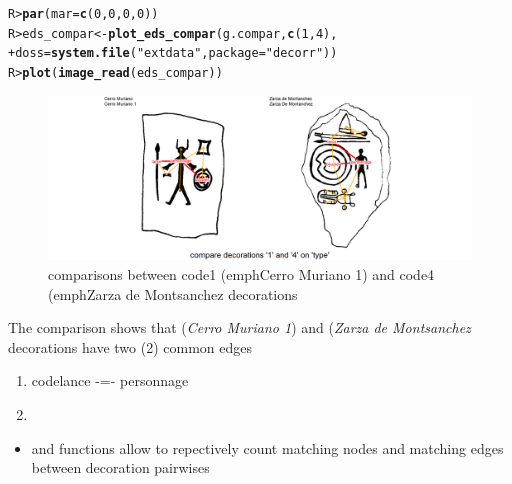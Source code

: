 \documentclass[article]{jss}\usepackage[]{graphicx}\usepackage[]{color}
\makeatletter
\def\maxwidth{ %
  \ifdim\Gin@nat@width>\linewidth
    \linewidth
  \else
    \Gin@nat@width
  \fi
}
\newcommand{\hlnum}[1]{\textcolor[rgb]{0.686,0.059,0.569}{#1}}%
\newcommand{\hlstr}[1]{\textcolor[rgb]{0.192,0.494,0.8}{#1}}%
\newcommand{\hlstd}[1]{\textcolor[rgb]{0.345,0.345,0.345}{#1}}%
\newcommand{\hlkwb}[1]{\textcolor[rgb]{0.69,0.353,0.396}{#1}}%
\newcommand{\hlkwc}[1]{\textcolor[rgb]{0.333,0.667,0.333}{#1}}%
\newcommand{\hlkwd}[1]{\textcolor[rgb]{0.737,0.353,0.396}{\textbf{#1}}}%
\newenvironment{kframe}{%
 \def\at@end@of@kframe{}%
 \ifinner\ifhmode%
  \def\at@end@of@kframe{\end{minipage}}%
  \begin{minipage}{\columnwidth}%
 \fi\fi%
 \def\FrameCommand##1{\hskip\@totalleftmargin \hskip-\fboxsep
 \colorbox{shadecolor}{##1}\hskip-\fboxsep
     \hskip-\linewidth \hskip-\@totalleftmargin \hskip\columnwidth}%
 \MakeFramed {\advance\hsize-\width
   \@totalleftmargin\z@ \linewidth\hsize
   \@setminipage}}%
 {\par\unskip\endMakeFramed%
 \at@end@of@kframe}
\newenvironment{knitrout}{}{} %
\makeatother
\begin{document}
\begin{knitrout}
\color{fgcolor}\begin{kframe}
\begin{alltt}
\hlstd{R> }\hlkwd{par}\hlstd{(}\hlkwc{mar}\hlstd{=}\hlkwd{c}\hlstd{(}\hlnum{0}\hlstd{,}\hlnum{0}\hlstd{,}\hlnum{0}\hlstd{,}\hlnum{0}\hlstd{))}
\hlstd{R> }\hlstd{eds_compar} \hlkwb{<-} \hlkwd{plot_eds_compar}\hlstd{(g.compar,} \hlkwd{c}\hlstd{(}\hlnum{1}\hlstd{,}\hlnum{4}\hlstd{),}
\hlstd{+ }                              \hlkwc{doss} \hlstd{=} \hlkwd{system.file}\hlstd{(}\hlstr{"extdata"}\hlstd{,} \hlkwc{package} \hlstd{=} \hlstr{"decorr"}\hlstd{))}
\hlstd{R> }\hlkwd{plot}\hlstd{(}\hlkwd{image_read}\hlstd{(eds_compar))}
\end{alltt}
\end{kframe}\begin{figure}[H]

{\centering \includegraphics[width=\maxwidth]{figure/unnamed-chunk-13-1} 

}

\caption{\label{fig:figs}comparisons between code{1} (emph{Cerro Muriano 1}) and code{4} (emph{Zarza de Montsanchez} decorations}\label{fig:unnamed-chunk-13}
\end{figure}


\end{knitrout}

The comparison shows that  (\emph{Cerro Muriano 1}) and  (\emph{Zarza de Montsanchez} decorations have two (2) common edges
\begin{enumerate}
\item code{lance -=- personnage}
\item {}
\end{enumerate}

\begin{itemize}
\setlength\itemsep{.1em}
  \item {} and  functions allow to repectively count matching nodes and matching edges between decoration pairwises
\end{itemize}
\end{document}
